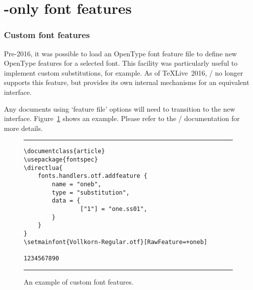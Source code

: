 

\part{\LuaTeX-only font features}
\label{sec:luatex-features}

\section{Custom font features}

Pre-2016, it was possible to load an OpenType font feature file to define new OpenType features for a selected font. This facility was particularly useful to implement custom substitutions, for example.  As of \TeX{}Live~2016, \LuaTeX/ no longer supports this feature, but provides its own internal mechanisms for an equivalent interface.

Any documents using `feature file' options will need to transition to the new interface.
Figure~\ref{fig:featurefile} shows an example.
Please refer to the \LuaTeX/ documentation for more details.

\begin{figure}
\caption{An example of custom font features.}
\label{fig:featurefile}
\hrule
\begin{Verbatim}
\documentclass{article}
\usepackage{fontspec}
\directlua{
    fonts.handlers.otf.addfeature {
        name = "oneb",
        type = "substitution",
        data = {
                ["1"] = "one.ss01",
        }
    }
}
\setmainfont{Vollkorn-Regular.otf}[RawFeature=+oneb]

1234567890

\end{Verbatim}
\hrule
\end{figure}




%
%

